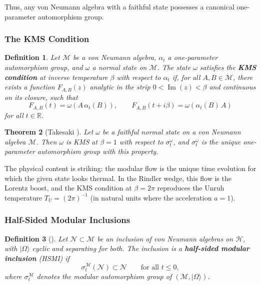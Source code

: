 \documentclass[12pt,a4paper]{article}
\newtheorem{theorem}{Theorem}[section]
\newtheorem{definition}[theorem]{Definition}
\begin{document}
Thus, any von Neumann algebra with a faithful state possesses a canonical one-parameter automorphism group.

\subsubsection{The KMS Condition}

\begin{definition}
Let $\mathcal{M}$ be a von Neumann algebra, $\alpha_t$ a one-parameter automorphism group, and $\omega$ a normal state on $\mathcal{M}$.
The state $\omega$ satisfies the \textbf{KMS condition} at inverse temperature $\beta$ with respect to $\alpha_t$ if, for all $A, B \in \mathcal{M}$, there exists a function $F_{A,B}(z)$ analytic in the strip $0 < \operatorname{Im}(z) < \beta$ and continuous on its closure, such that
\begin{equation}
F_{A,B}(t) = \omega(A \,\alpha_t(B)), \qquad F_{A,B}(t + i\beta) = \omega(\alpha_t(B)\, A)
\end{equation}
for all $t \in \mathbb{R}$.
\end{definition}

\begin{theorem}[Takesaki {\cite{Takesaki2003}}]
\label{thm:KMS-unique}
Let $\omega$ be a faithful normal state on a von Neumann algebra $\mathcal{M}$.
Then $\omega$ is KMS at $\beta = 1$ with respect to $\sigma_t^\omega$, and $\sigma_t^\omega$ is the \emph{unique} one-parameter automorphism group with this property.
\end{theorem}

The physical content is striking: the modular flow is the unique time evolution for which the given state looks thermal.
In the Rindler wedge, this flow is the Lorentz boost, and the KMS condition at $\beta = 2\pi$ reproduces the Unruh temperature $T_U = (2\pi)^{-1}$ (in natural units where the acceleration $a = 1$).

\subsubsection{Half-Sided Modular Inclusions}

\begin{definition}[{\cite{Wiesbrock1993}}]
Let $\mathcal{N} \subset \mathcal{M}$ be an inclusion of von Neumann algebras on $\mathcal{H}$, with $|\Omega\rangle$ cyclic and separating for both.
The inclusion is a \textbf{half-sided modular inclusion} (HSMI) if
\begin{equation}
\sigma_t^{\mathcal{M}}(\mathcal{N}) \subset \mathcal{N} \qquad \text{for all } t \leq 0,
\end{equation}
where $\sigma_t^{\mathcal{M}}$ denotes the modular automorphism group of $(\mathcal{M}, |\Omega\rangle)$.
\end{definition}
\end{document}

